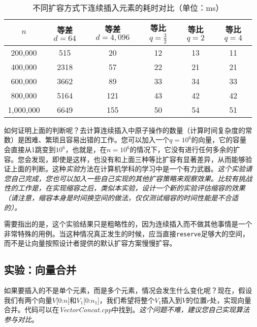 \begin{table}
  \centering
  \caption{不同扩容方式下连续插入元素的耗时对比（单位：ms）}
  \begin{tabular}{c|ccccc}
    \toprule
       $n$ & \thead{等差 \\ $d=64$} & \thead{等差 \\ $d=4,096$} & \thead{等比\\ $q=\frac{3}2$} & \thead{等比 \\ $q=2$} & \thead{等比 \\ $q=4$} 
      \\
    \midrule
    200,000 & 515 & 20 & 12 & 13 & 11 \\ 
    400,000 & 2318 & 57 & 22 & 21 & 21 \\
    600,000 & 3662 & 89 & 33 & 34 & 33 \\
    800,000 & 5164 & 121 & 43 & 42 & 42  \\
    1,000,000 & 6649 & 155 & 50 & 54 & 51 
      \\ 
    \bottomrule
  \end{tabular}
  \label{tab:vec1}
\end{table}

如何证明上面的判断呢？去计算连续插入中原子操作的数量（计算时间复杂度的常数）是困难、繁琐且容易出错的工作。您可以加入一个$q=10^6$的向量，它的容量会直接从1跳变到$10^6$，也就是，在$n=10^6$的情况下，它没有进行任何多余的扩容。您会发现，即使是这样，也没有和上面三种等比扩容有显著差异，从而能够验证上面的判断。这种\textit{实验}方法在计算机学科的学习中是一个有力武器。\textit{这个实验请您自己完成，您也可以加入一些自己实现的其他扩容策略来观察效果。比较有挑战性的工作是，在实现缩容之后，类似本实验，设计一个新的实验评估缩容的效果（请注意，缩容本身是时间换空间的做法，仅仅测试缩容的时间性能是不合适的）。}

需要指出的是，这个实验结果只是粗略性的，因为连续插入而不做其他事情是一个非常特殊的用例。当这种情况真正发生的时候，应当直接\lstinline{reserve}足够大的空间，而不是让向量按照设计者提供的默认扩容方案慢慢扩容。

\subsection{实验：向量合并}
\label{vec:向量合并}
如果要插入的不是单个元素，而是多个元素，情况会发生什么变化呢？现在，假设我们有两个向量$V[0$:$n]$和$V_1[0$:$n_1]$，我们希望将整个$V_1$插入到$V$的位置$r$处，实现向量合并。代码可以在\textit{VectorConcat.cpp}中找到。\textit{这个问题不难，建议您自己实现算法参与对比}。

